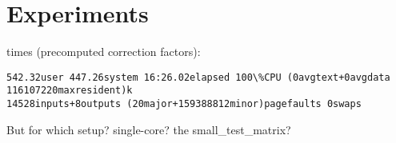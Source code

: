 \chapter{Experiments}\label{chap:experiments}

% 
% 


times (precomputed correction factors):
\begin{verbatim}
542.32user 447.26system 16:26.02elapsed 100\%CPU (0avgtext+0avgdata 116107220maxresident)k
14528inputs+8outputs (20major+159388812minor)pagefaults 0swaps
\end{verbatim}

But for which setup? single-core? the small\_test\_matrix?





